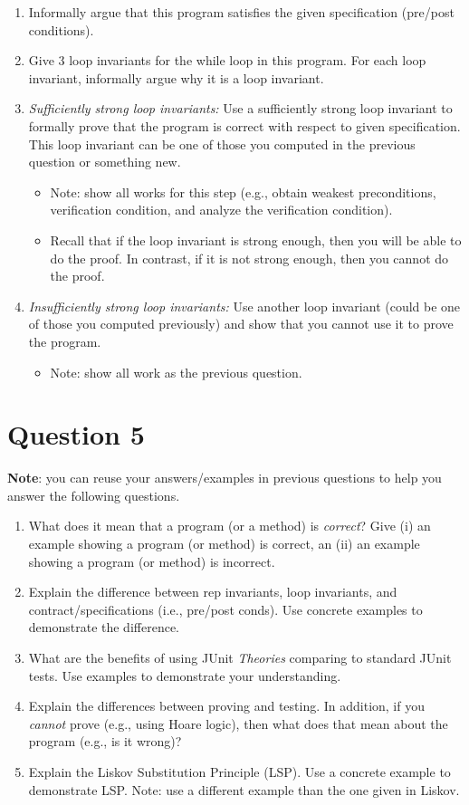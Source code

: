\documentclass[10pt]{article}
\begin{document}
\begin{enumerate}
\item Informally argue that this program satisfies the given specification (pre/post conditions).
\item Give 3 loop invariants for the while loop in this program. For each loop invariant, informally argue why it is a loop invariant.  
\item \emph{Sufficiently strong loop invariants:}  Use a sufficiently strong loop invariant to formally prove that the program is correct with respect to given specification. This loop invariant can be one of those you computed in the previous question or something new.
  \begin{itemize}
    \item Note: show all works for this step (e.g., obtain weakest preconditions, verification condition, and analyze the verification condition).
  \item Recall that if the loop invariant is strong enough, then you will be able to do the proof. In contrast, if it is not strong enough, then you cannot do the proof.
  \end{itemize}
\item \emph{Insufficiently strong loop invariants:} Use another loop invariant (could be one of those you computed previously) and show that you cannot use it to prove the program. 
  \begin{itemize}
    \item Note: show all work as the previous question.
  \end{itemize}
\end{enumerate}

\newpage
\section{Question 5}

\textbf{Note}: you can reuse your answers/examples in previous questions to help you answer the following questions.

\begin{enumerate}
  \item What does it mean that a program (or a method) is \emph{correct}?  Give (i) an example showing a program (or method) is correct, an (ii) an example showing a program (or method) is incorrect.  
  \item Explain the difference between rep invariants, loop invariants, and contract/specifications (i.e., pre/post conds).  Use concrete examples to demonstrate the difference.  
  \item What are the benefits of using JUnit \emph{Theories} comparing to standard JUnit tests. Use examples to demonstrate your understanding.  
  \item Explain the differences between proving and testing.  In addition, if you \emph{cannot} prove (e.g., using Hoare logic), then what does that mean about the program (e.g., is it wrong)? 
  \item Explain the Liskov Substitution Principle (LSP).  Use a concrete example to demonstrate LSP. Note: use a different example than the one given in Liskov.  
\end{enumerate}
\end{document}
